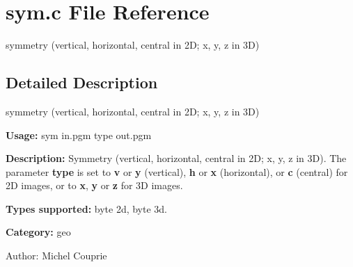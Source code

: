 \section{sym.c File Reference}
\label{sym_8c}
symmetry (vertical, horizontal, central in 2D; x, y, z in 3D)  




\label{_details}
\subsection{Detailed Description}
symmetry (vertical, horizontal, central in 2D; x, y, z in 3D) 

{\bf Usage:} sym in.pgm type out.pgm

{\bf Description:} Symmetry (vertical, horizontal, central in 2D; x, y, z in 3D). The parameter {\bf type} is set to {\bf v} or {\bf y} (vertical), {\bf h} or {\bf x} (horizontal), or {\bf c} (central) for 2D images, or to {\bf x}, {\bf y} or {\bf z} for 3D images.

{\bf Types supported:} byte 2d, byte 3d.

{\bf Category:} geo

\begin{Desc}
\item[Author:]Michel Couprie \end{Desc}
